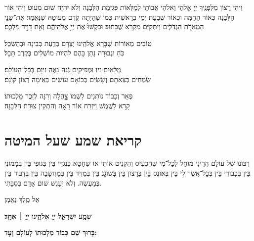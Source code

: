 \documentclass[twoside, openany, parskip=half, 11pt]{book}
\begin{document}
וִיהִי רָצוֹן מִלְּפָנֶֽיךָ יְיָ אֱלֹהַי וֵאלֹהֵי אֲבוֹתַי לְמַלְּאוֹת פְּגִימַת הַלְּבָנָה וְלֹא יִהְיֶה שׁוּם מִעוּט׃ וִיהִי אוֹר הַלְּבָנָה כְּאוֹר הַחַמָּה וּכְאוֹר שִׁבְעַת יְמֵי בְרֵאשִׁית כְּמוֹ שֶׁהָיְתָה קֹֽדֶם מִעוּטָהּ שֶׁנֶּאֱמַר׃
אֶת־שְׁנֵ֥י הַמְּאֹרֹ֖ת הַגְּדֹלִ֑ים
וְיִתְקַיַּם מִקְרָא שֶׁכָּתוּב׃ 
וּבִקְשׁוּ֙ אֶת־יְיָ֣ אֱלֹהֵיהֶ֔ם וְאֵ֖ת דָּוִ֣יד מַלְכָּ֑ם׃

\lamenatzeachbinginot

\aleinu

\mournerskaddish

טוֹבִים מְאוֹרוֹת שֶׁבָּרָא אֱלֹהֵֽינוּ \hfill יְצָרָם בְּדַֽעַת בְּבִינָה וּבְהַשְׂכֵּל׃\\
כֹּֽחַ וּגְבוּרָה נָתַן בָּהֶם \hfill לִהְיוֹת מוֹשְׁלִים בְּקֶֽרֶב תֵּבֵל׃

מְלֵאִים זִיו וּמְפִיקִים נֹֽגַהּ \hfill נָאֶה זִיוָם בְּכׇל־הָעוֹלָם׃ \\
שְׂמֵחִים בְּצֵאתָם וְשָׂשִׂים בְּבוֹאָם \hfill עוֹשִׂים בְּאֵימָה רְצוֹן קוׂנָם׃

פְּאֵר וְכָבוֹד נוֹתְנִים לִשְׁמוֹ \hfill צׇׇׇׇׇהֳלָה וְרִנָּה לְזֵֽכֶר מַלְכוּתוֹ׃ \\
קָרָא לַשֶּֽׁמֶשׁ וַיִּזְרַח אוֹר \hfill רָאָה וְהִתְקִין צוּרַת הַלְּבָנָה׃

\chapter[ק״ש שעל המיטה]{ קריאת שמע שעל המיטה }

רִבּוֹנוֹ שֶׁל עוֹלָם הֲרֵינִי מוֹחֵל לְכׇל־מִי שֶׁהִכְעִיס וְהִקְנִיט אוֹתִי אוֹ שֶׁחָטָא כְּנֶגְדִּי בֵּין בְּגוּפִי בֵּין בְּמָמוֹנִי בֵּין בִּכְבוֹדִי בֵּין בְּכׇל־אֲשֶׁר לִי בֵּין בְּאוֹנֶס בֵּין בְּרָצוֹן בֵּין בְּשׁוֹגֵג בֵּין בְּמֵזִיד בֵּין בְּמַחֲשָׁבָה בֵּין בְּדִבּוּר בֵּין בְּמַעֲשֶׂה. וְלֹא יֵעָנֵשׁ שׁוּם אָדָם בְּסִבָּתִי.


\begin{footnotesize}אֵל מֶֽלֶךְ נֶאֱמָן\end{footnotesize}

\begin{Large}
\textbf{
שְׁמַ֖ע יִשְׂרָאֵ֑ל יְיָ֥ אֱלֹהֵ֖ינוּ יְיָ֥ ׀ אֶחָֽד׃} \\
\end{Large}
\begin{large}
 \textbf{בָּרוּךְ שֵׁם כְּבוֹד מַלְכוּתוֹ לְעוֹלָם וָעֶד:}
\end{large}
\end{document}
